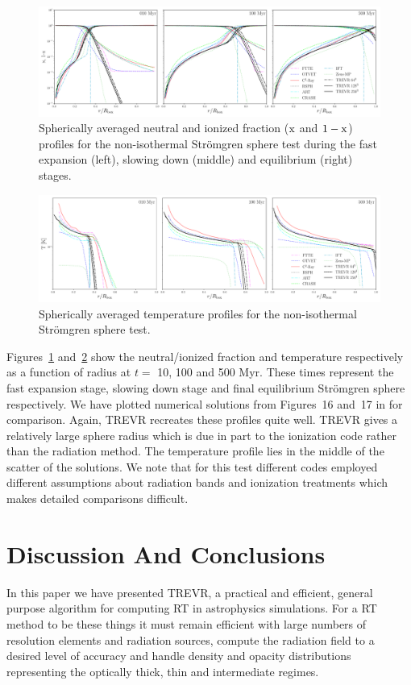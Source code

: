\documentclass[fleq,usenatbib]{mnras}
\newcommand{\acro}{TREVR}
\newcommand{\strom}{Str\"omgren}
\begin{document}
{\begin{figure}
\includegraphics[width=0.95\linewidth]{Figures/strom_fraction.pdf}
\caption{Spherically averaged neutral and ionized fraction 
($\rm x$ and $\rm 1-x$) profiles for the non-isothermal \strom{} sphere test 
during the fast expansion (left), slowing down (middle) and equilibrium 
(right) stages.}
\label{fig:stromtherm}
\end{figure}
\begin{figure}
\includegraphics[width=0.95\linewidth]{Figures/strom_temp.pdf}
\caption{Spherically averaged temperature profiles for the non-isothermal 
\strom{} sphere test.}
\label{fig:stromtemp}
\end{figure}
Figures~\ref{fig:stromtherm} and~\ref{fig:stromtemp} show the neutral/ionized 
fraction and temperature respectively as a function of radius at $t=$ 10, 100
and 500 Myr. These times represent the fast expansion stage, slowing down 
stage and final equilibrium \strom{} sphere respectively. We have plotted 
numerical solutions from Figures~16 and~17 in \cite{ilievEt06} for comparison. 
Again, \acro{} recreates these profiles quite well.
\acro{} gives a relatively large sphere radius which is 
due in part to the ionization code rather than the radiation method.  
The temperature profile lies in the middle of the scatter of the 
\cite{ilievEt06} solutions.  We note that for this test different codes employed
different assumptions about radiation bands and ionization treatments which
makes detailed comparisons difficult.

\section{Discussion And Conclusions}\label{sec:disc}
In this paper we have presented \acro{}, a practical and efficient, general 
purpose algorithm for computing RT in astrophysics simulations. For a RT 
method to be these things it must remain efficient with large numbers of 
resolution elements and radiation sources, compute the radiation field to a 
desired level of accuracy and handle density and opacity distributions 
representing the optically thick, thin and intermediate regimes.

}
\end{document}
